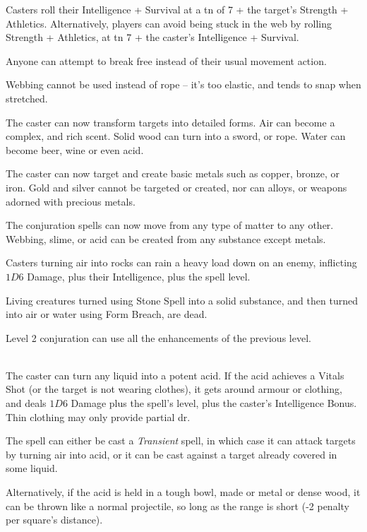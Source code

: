 \begin{multicols}{2}
Casters roll their Intelligence + Survival at a \gls{tn} of 7 + the target's Strength + Athletics. Alternatively, players can avoid being stuck in the web by rolling Strength + Athletics, at \gls{tn} 7 + the caster's Intelligence + Survival.

Anyone can attempt to break free instead of their usual movement action.

Webbing cannot be used instead of rope -- it's too elastic, and tends to snap when stretched.

The caster can now transform targets into detailed forms.  Air can become a complex, and rich scent.  Solid wood can turn into a sword, or rope.  Water can become beer, wine or even acid.

The caster can now target and create basic metals such as copper, bronze, or iron.  Gold and silver cannot be targeted or created, nor can alloys, or weapons adorned with precious metals.

The conjuration spells can now move from any type of matter to any other.  Webbing, slime, or acid can be created from any substance except metals.

Casters turning air into rocks can rain a heavy load down on an enemy, inflicting $1D6$ Damage, plus their Intelligence, plus the spell level.

Living creatures turned using Stone Spell into a solid substance, and then turned into air or water using Form Breach, are dead.

\spelllevel

Level 2 conjuration can use all the enhancements of the previous level.

\\
The caster can turn any liquid into a potent acid.
If the acid achieves a Vitals Shot (or the target is not wearing clothes), it gets around armour or clothing, and deals $1D6$ Damage plus the spell's level, plus the caster's Intelligence Bonus.
Thin clothing may only provide partial \gls{dr}.

The spell can either be cast a \textit{Transient} spell, in which case it can attack targets by turning air into acid, or it can be cast against a target already covered in some liquid.

Alternatively, if the acid is held in a tough bowl, made or metal or dense wood, it can be thrown like a normal projectile, so long as the range is short (-2 penalty per square's distance).


\end{multicols}
